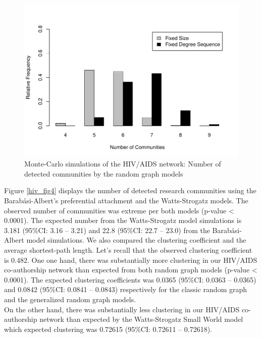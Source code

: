 \begin{figure}[h!]
\includegraphics[scale=0.65]{Chapters/hiv/randomComm}
\centering
\caption{Monte-Carlo simulations of the HIV/AIDS network: Number of detected communities by the random graph models}
\label{hiv_fig3}
\end{figure}

Figure \ref{hiv_fig4} displays the number of detected research communities using the Barab\'asi-Albert's preferential attachment and the Watts-Strogatz models. The observed number of communities was extreme per both models (p-value < 0.0001). The expected number from the Watts-Strogatz model simulations is 3.181 (95\%CI: 3.16 -- 3.21) and 22.8 (95\%CI: 22.7 -- 23.0) from the Barab\'asi-Albert model simulations. 
We also compared the clustering coefficient and the average shortest-path length. Let's recall that the observed clustering coefficient is 0.482. One one hand, there was substantially more clustering in our HIV/AIDS co-authorship network than expected from both random graph models (p-value < 0.0001). The expected clustering coefficients was 0.0365 (95\%CI: 0.0363 -- 0.0365) and 0.0842 (95\%CI: 0.0841 -- 0.0843) respectively for the classic random graph and the generalized random graph models.\\
On the other hand, there was substantially less clustering in our HIV/AIDS co-authorship network than expected by the Watts-Strogatz Small World model which expected clustering was 0.72615 (95\%CI: 0.72611 -- 0.72618).

